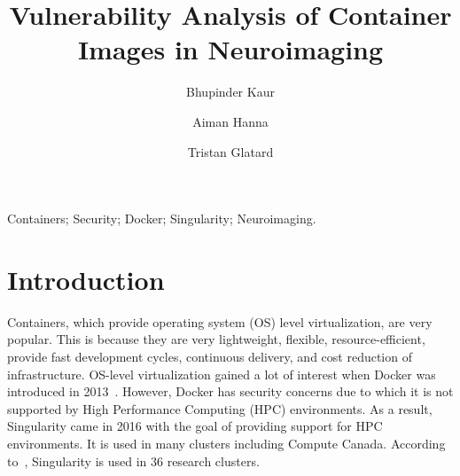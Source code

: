 \documentclass[a4paper,num-refs]{oup-contemporary}
\title{Vulnerability Analysis of Container Images in Neuroimaging}
\begin{document}
\author[1]{Bhupinder Kaur}
\author[1]{Aiman Hanna}
\author[1]{Tristan Glatard}


\maketitle

\begin{keywords}
Containers; Security; Docker; Singularity; Neuroimaging.
\end{keywords}


\section{Introduction}

Containers, which provide operating system (OS) level virtualization, are very
popular. This is because they are very lightweight, flexible, resource-efficient,
provide fast development cycles, continuous delivery,
and cost reduction of infrastructure. OS-level virtualization gained a lot of interest when Docker was
introduced in 2013~\cite{gantikow2016providing}. However, Docker has security concerns due to which it
is not supported by High Performance
Computing (HPC) environments. As a result, Singularity came in 2016 with the goal of providing support
for HPC environments. It is used in many clusters including Compute Canada.
According to~\cite{kurtzer2017singularity}, Singularity is used in 36 research clusters.

\end{document}
